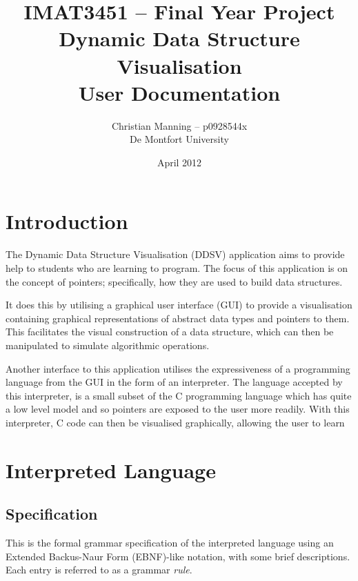 \documentclass[a4paper,11pt]{article}
\author{Christian Manning -- p0928544x\\
De Montfort University}
\title{IMAT3451 -- Final Year Project\\
    Dynamic Data Structure Visualisation\\
    User Documentation
}
\date{April 2012}
\begin{document}
\maketitle

\tableofcontents
\listoffigures

\clearpage

\section{Introduction}

The Dynamic Data Structure Visualisation (DDSV) application aims to provide help to students who are learning to program.
The focus of this application is on the concept of pointers; specifically, how they are used to build data structures.

It does this by utilising a graphical user interface (GUI) to provide a visualisation containing graphical representations of abstract data types and pointers to them.
This facilitates the visual construction of a data structure, which can then be manipulated to simulate algorithmic operations.

Another interface to this application utilises the expressiveness of a programming language from the GUI in the form of an interpreter.
The language accepted by this interpreter, is a small subset of the C programming language which has quite a low level model and so pointers are exposed to the user more readily.
With this interpreter, C code can then be visualised graphically, allowing the user to learn 


\section{Interpreted Language}

\subsection{Specification}

This is the formal grammar specification of the interpreted language using an Extended Backus-Naur Form (EBNF)-like notation, with some brief descriptions.
Each entry is referred to as a grammar \textit{rule}.
\end{document}
